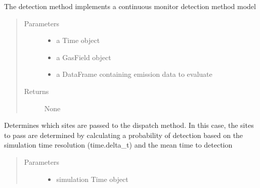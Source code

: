 \documentclass[letterpaper,10pt,english]{sphinxmanual}
\begin{document}
\begin{fulllineitems}
\begin{fulllineitems}
\label{\detokenize{index:feast.DetectionModules.site_monitor.SiteMonitor.detect}}
The detection method implements a continuous monitor detection method model
\begin{quote}\begin{description}
\item[{Parameters}] \leavevmode\begin{itemize}
\item {} 
 \textendash{} a Time object

\item {} 
 \textendash{} a GasField object

\item {} 
 \textendash{} a DataFrame containing emission data to evaluate

\end{itemize}

\item[{Returns}] \leavevmode
None

\end{description}\end{quote}

\end{fulllineitems}


\begin{fulllineitems}
\label{\detokenize{index:feast.DetectionModules.site_monitor.SiteMonitor.detect_prob_curve}}
Determines which sites are passed to the dispatch method.
In this case, the sites to pass are determined by calculating a probability of detection based on the
simulation time resolution (time.delta\_t) and the mean time to detection
\begin{quote}\begin{description}
\item[{Parameters}] \leavevmode\begin{itemize}
\item {} 
 \textendash{} simulation Time object


\end{itemize}
\end{description}
\end{quote}
\end{fulllineitems}
\end{fulllineitems}
\end{document}
